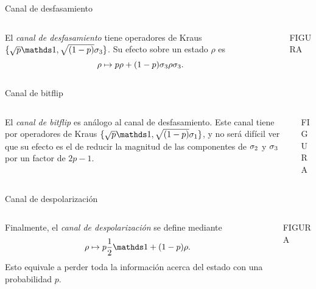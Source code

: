 \begin{frame}{Canal de desfasamiento}
    \begin{columns}
        \begin{column}{0.5\textwidth}
            El \textit{canal de desfasamiento} tiene operadores de Kraus $\{\sqrt{p}\Id,\sqrt{(1-p)}\pauli{3}\}$. Su efecto sobre un estado $\rho$ es
            \begin{equation}
                \rho\mapsto p\rho+(1-p)\sigma_{3}\rho\sigma_{3}.\nonumber
            \end{equation}
        \end{column}
        \begin{column}{0.5\textwidth}
            FIGURA
        \end{column}
    \end{columns}
\end{frame}

\begin{frame}{Canal de bitflip}
    \begin{columns}
        \begin{column}{0.5\textwidth}
            El \textit{canal de bitflip} es análogo al canal de desfasamiento. Este canal tiene por operadores de Kraus $\{\sqrt{p}\Id,\sqrt{(1-p)}\pauli{1}\}$, y no será difícil ver que su efecto es el de reducir la magnitud de las componentes de $\sigma_{2}$ y $\sigma_{3}$ por un factor de $2p-1$.
        \end{column}
        \begin{column}{0.5\textwidth}
            FIGURA
        \end{column}
    \end{columns}
\end{frame}

\begin{frame}{Canal de despolarización}
    \begin{columns}
        \begin{column}{0.5\textwidth}
            Finalmente, el \textit{canal de despolarización} se define mediante
            \begin{equation}
                \rho\mapsto p\frac{1}{2}\Id+(1-p)\rho\nonumber.
            \end{equation}
Esto equivale a perder toda la información acerca del estado con una probabilidad $p$.
        \end{column}
        \begin{column}{0.5\textwidth}
            FIGURA
        \end{column}
    \end{columns}
\end{frame}


